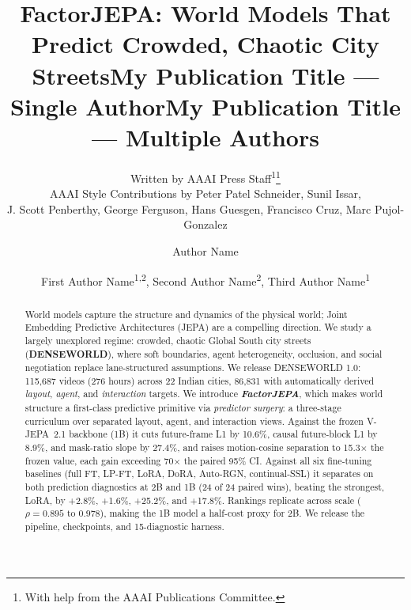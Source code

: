 \documentclass[letterpaper]{article} %
\title{FactorJEPA: World Models That Predict Crowded, Chaotic City Streets}
\author{
    Written by AAAI Press Staff\textsuperscript{\rm 1}\thanks{With help from the AAAI Publications Committee.}\\
    AAAI Style Contributions by Peter Patel Schneider,
    Sunil Issar,\\
    J. Scott Penberthy,
    George Ferguson,
    Hans Guesgen,
    Francisco Cruz\equalcontrib\corresponding,
    Marc Pujol-Gonzalez\equalcontrib\corresponding
}
\title{My Publication Title --- Single Author}
\author {
    Author Name
}
\title{My Publication Title --- Multiple Authors}
\author {
    First Author Name\textsuperscript{\rm 1,\rm 2}\equalcontrib,
    Second Author Name\textsuperscript{\rm 2}\equalcontrib,
    Third Author Name\textsuperscript{\rm 1}\corresponding
}
\begin{document}
\maketitle

\begin{abstract}


World models capture the structure and dynamics of the physical world; Joint Embedding Predictive Architectures (JEPA) are a compelling direction. We study a largely unexplored regime: crowded, chaotic Global South city streets (\textbf{DENSEWORLD}), where soft boundaries, agent heterogeneity, occlusion, and social negotiation replace lane-structured assumptions. We release DENSEWORLD 1.0: 115,687 videos (276 hours) across 22 Indian cities, 86,831 with automatically derived \emph{layout}, \emph{agent}, and \emph{interaction} targets. We introduce \textbf{\emph{FactorJEPA}}, which makes world structure a first-class predictive primitive via \emph{predictor surgery}: a three-stage curriculum over separated layout, agent, and interaction views. Against the frozen V-JEPA~2.1 backbone (1B) it cuts future-frame L1 by 10.6\%, causal future-block L1 by 8.9\%, and mask-ratio slope by 27.4\%, and raises motion-cosine separation to 15.3$\times$ the frozen value, each gain exceeding 70$\times$ the paired 95\% CI. Against all six fine-tuning baselines (full FT, LP-FT, LoRA, DoRA, Auto-RGN, continual-SSL) it separates on both prediction diagnostics at 2B and 1B (24 of 24 paired wins), beating the strongest, LoRA, by +2.8\%, +1.6\%, +25.2\%, and +17.8\%. Rankings replicate across scale ($\rho=0.895$ to $0.978$), making the 1B model a half-cost proxy for 2B. We release the pipeline, checkpoints, and 15-diagnostic harness.





\end{abstract}









\end{document}
